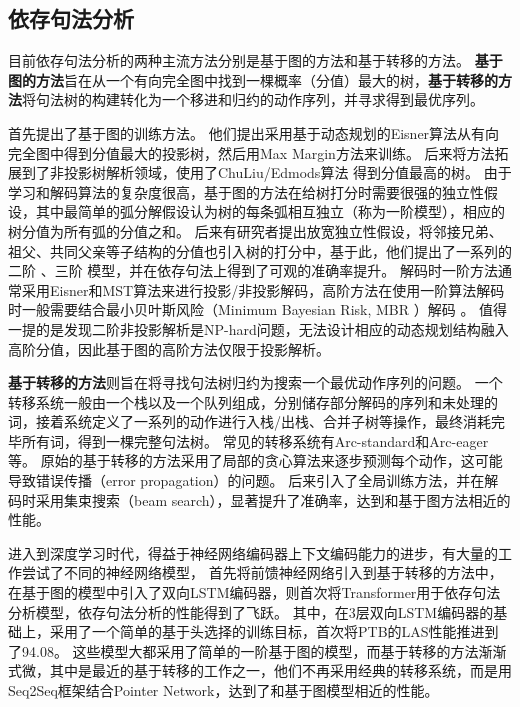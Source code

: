 \subsection{依存句法分析}

目前依存句法分析的两种主流方法分别是基于图的方法和基于转移的方法。
\textbf{基于图的方法}旨在从一个有向完全图中找到一棵概率（分值）最大的树，\textbf{基于转移的方法}将句法树的构建转化为一个移进和归约的动作序列，并寻求得到最优序列。

\citet{mcdonald-etal-2005-online}首先提出了基于图的训练方法。
他们提出采用基于动态规划的Eisner算法从有向完全图中得到分值最大的投影树，然后用Max Margin方法来训练。
后来\citet{mcdonald-etal-2005-non}将方法拓展到了非投影树解析领域，使用了ChuLiu/Edmods算法 \citep{chu-1965-shortest}得到分值最高的树。
由于学习和解码算法的复杂度很高，基于图的方法在给树打分时需要很强的独立性假设，其中最简单的弧分解假设认为树的每条弧相互独立（称为一阶模型），相应的树分值为所有弧的分值之和。
后来有研究者提出放宽独立性假设，将邻接兄弟、祖父、共同父亲等子结构的分值也引入树的打分中，基于此，他们提出了一系列的二阶 \citep{mcdonald-pereira-2006-online,carreras-2007-experiments}、三阶 \citep{koo-collins-2010-efficient}模型，并在依存句法上得到了可观的准确率提升。
解码时一阶方法通常采用Eisner和MST算法来进行投影/非投影解码，高阶方法在使用一阶算法解码时一般需要结合最小贝叶斯风险（Minimum Bayesian Risk, MBR ）解码 \citep{smith-smith-2007-probabilistic}。
值得一提的是\citet{mcdonald-pereira-2006-online}发现二阶非投影解析是NP-hard问题，无法设计相应的动态规划结构融入高阶分值，因此基于图的高阶方法仅限于投影解析。

\textbf{基于转移的方法}则旨在将寻找句法树归约为搜索一个最优动作序列的问题。
一个转移系统一般由一个栈以及一个队列组成，分别储存部分解码的序列和未处理的词，接着系统定义了一系列的动作进行入栈/出栈、合并子树等操作，最终消耗完毕所有词，得到一棵完整句法树。
常见的转移系统有Arc-standard和Arc-eager等。
原始的基于转移的方法采用了局部的贪心算法来逐步预测每个动作，这可能导致错误传播（error propagation）的问题。
后来\citet{zhang-clark-2008-tale,huang-etal-2009-bilingually}引入了全局训练方法，并在解码时采用集束搜索（beam search），显著提升了准确率，达到和基于图方法相近的性能。

进入到深度学习时代，得益于神经网络编码器上下文编码能力的进步，有大量的工作尝试了不同的神经网络模型，
\citet{chen-manning-2014-fast}首先将前馈神经网络引入到基于转移的方法中，\citet{kiperwasser-goldberg-2016-simple,wang-chang-2016-graph}在基于图的模型中引入了双向LSTM编码器，\citet{li-etal-2019-attentive}则首次将Transformer用于依存句法分析模型，依存句法分析的性能得到了飞跃。
其中，\citet{dozat-etal-2017-biaffine}在3层双向LSTM编码器的基础上，采用了一个简单的基于头选择的训练目标，首次将PTB的LAS性能推进到了94.08。
这些模型大都采用了简单的一阶基于图的模型，而基于转移的方法渐渐式微，其中\citet{ma-etal-2018-stack}是最近的基于转移的工作之一，他们不再采用经典的转移系统，而是用Seq2Seq框架结合Pointer Network，达到了和基于图模型相近的性能。

